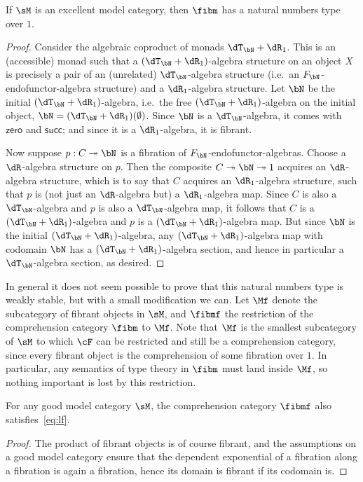\documentclass{amsart}
\def\zero{\mathsf{zero}}
\def\succ{\mathsf{succ}}
\begin{document}
\begin{thm}
  If $\sM$ is an excellent model category, then $\fibm$ has a natural numbers type over $1$.
\end{thm}
\begin{proof}
  Consider the algebraic coproduct of monads $\dT_\bN+\dR_1$.
  This is an (accessible) monad such that a $(\dT_\bN+\dR_1)$-algebra structure on an object $X$ is precisely a pair of an (unrelated) $\dT_\bN$-algebra structure (i.e.\ an $F_\bN$-endofunctor-algebra structure) and a $\dR_1$-algebra structure.
  Let $\bN$ be the initial $(\dT_\bN+\dR_1)$-algebra, i.e.\ the free $(\dT_\bN+\dR_1)$-algebra on the initial object, $\bN =(\dT_\bN+\dR_1)(\emptyset)$.
  Since $\bN$ is a $\dT_\bN$-algebra, it comes with $\zero$ and $\succ$; and since it is a $\dR_1$-algebra, it is fibrant.

  Now suppose $p:C\fib \bN$ is a fibration of $F_\bN$-endofunctor-algebras.
  Choose a $\dR$-algebra structure on $p$.
  Then the composite $C\fib\bN\fib 1$ acquires an $\dR$-algebra structure, which is to say that $C$ acquires an $\dR_1$-algebra structure, such that $p$ is (not just an $\dR$-algebra but) a $\dR_1$-algebra map.
  Since $C$ is also a $\dT_\bN$-algebra and $p$ is also a $\dT_\bN$-algebra map, it follows that $C$ is a $(\dT_\bN+\dR_1)$-algebra and $p$ is a $(\dT_\bN+\dR_1)$-algebra map.
  But since $\bN$ is the initial $(\dT_\bN+\dR_1)$-algebra, any $(\dT_\bN+\dR_1)$-algebra map with codomain $\bN$ has a $(\dT_\bN+\dR_1)$-algebra section, and hence in particular a $\dT_\bN$-algebra section, as desired.
\end{proof}

In general it does not seem possible to prove that this natural numbers type is weakly stable, but with a small modification  we can.
Let $\Mf$ denote the subcategory of fibrant objects in $\sM$, and $\fibmf$ the restriction of the comprehension category $\fibm$ to $\Mf$.
Note that $\Mf$ is the smallest subcategory of $\sM$ to which $\cF$ can be restricted and still be a comprehension category, since every fibrant object is the comprehension of some fibration over $1$.
In particular, any semantics of type theory in $\fibm$ must land inside $\Mf$, so nothing important is lost by this restriction.

\begin{lem}
  For any good model category $\sM$, the comprehension category $\fibmf$ also satisfies~\eqref{eq:lf}.
\end{lem}
\begin{proof}
  The product of fibrant objects is of course fibrant, and the assumptions on a good model category ensure that the dependent exponential of a fibration along a fibration is again a fibration, hence its domain is fibrant if its codomain is.
\end{proof}
\end{document}
